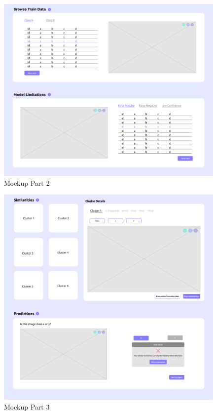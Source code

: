 \documentclass[11pt,a4paper,english]{scrreprt}
\begin{document}
\begin{figure}[htbp]
    \centering
    \includegraphics[width=\textwidth]{img/figures/mockups/mockup_2.png}
    \caption{Mockup Part 2}
    \label{fig:mockup_part_2}
\end{figure}

\begin{figure}[htbp]
    \centering
    \includegraphics[width=\textwidth]{img/figures/mockups/mockup_3.png}
    \caption{Mockup Part 3}
    \label{fig:mockup_part_3}
\end{figure}
\end{document}
